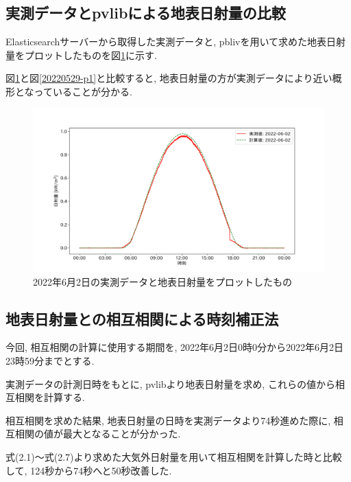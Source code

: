 \subsection{実測データとpvlibによる地表日射量の比較}
Elasticsearchサーバーから取得した実測データと, pblivを用いて求めた地表日射量をプロットしたものを図\ref{2-p1}に示す.

図\ref{2-p1}と図\ref{20220529-p1}と比較すると, 地表日射量の方が実測データにより近い概形となっていることが分かる.

\begin{figure}[h]
  \begin{center}
    \includegraphics[width=160mm]{sotu/figure/2/pvlib-20220602-corr.png}
    \caption{2022年6月2日の実測データと地表日射量をプロットしたもの}
    \label{2-p1}
  \end{center}
\end{figure}

\subsection{地表日射量との相互相関による時刻補正法}
今回, 相互相関の計算に使用する期間を, 2022年6月2日0時0分から2022年6月2日23時59分までとする.

実測データの計測日時をもとに, pvlibより地表日射量を求め, これらの値から相互相関を計算する.

相互相関を求めた結果, 地表日射量の日時を実測データより74秒進めた際に, 相互相関の値が最大となることが分かった.

式(2.1)～式(2.7)より求めた大気外日射量を用いて相互相関を計算した時と比較して, 124秒から74秒へと50秒改善した.

